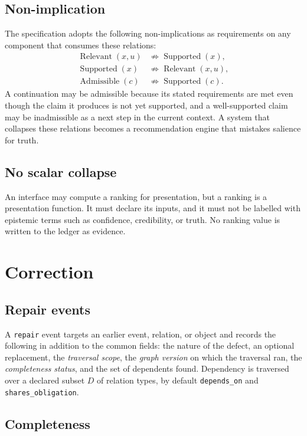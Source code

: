 \documentclass[11pt]{article}
\theoremstyle{definition}
\newcommand{\Rel}{\operatorname{Relevant}}
\newcommand{\Supp}{\operatorname{Supported}}
\newcommand{\Adm}{\operatorname{Admissible}}
\newcommand{\ev}[1]{\texttt{#1}}
\begin{document}
\subsection{Non-implication}

The specification adopts the following non-implications as requirements on any component that consumes these relations:
\begin{align*}
\Rel(x,u) &\not\Rightarrow \Supp(x),\\
\Supp(x) &\not\Rightarrow \Rel(x,u),\\
\Adm(c) &\not\Rightarrow \Supp(c).
\end{align*}
A continuation may be admissible because its stated requirements are met even though the claim it produces is not yet supported, and a well-supported claim may be inadmissible as a next step in the current context. A system that collapses these relations becomes a recommendation engine that mistakes salience for truth.

\subsection{No scalar collapse}

An interface may compute a ranking for presentation, but a ranking is a presentation function. It must declare its inputs, and it must not be labelled with epistemic terms such as confidence, credibility, or truth. No ranking value is written to the ledger as evidence.

\section{Correction}
\label{sec:repair}

\subsection{Repair events}

A \ev{repair} event targets an earlier event, relation, or object and records the following in addition to the common fields: the nature of the defect, an optional replacement, the \emph{traversal scope}, the \emph{graph version} on which the traversal ran, the \emph{completeness status}, and the set of dependents found. Dependency is traversed over a declared subset $D$ of relation types, by default \ev{depends\_on} and \ev{shares\_obligation}.

\subsection{Completeness}
\end{document}
